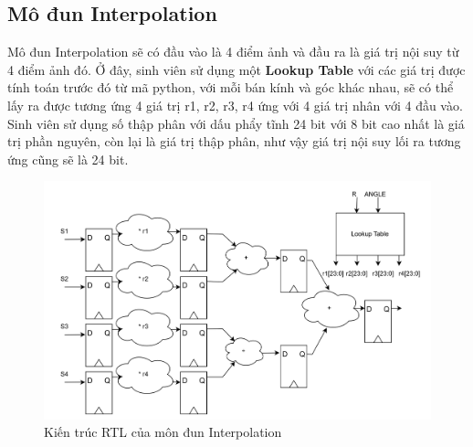 \subsection{Mô đun Interpolation}
Mô đun Interpolation sẽ có đầu vào là 4 điểm ảnh và đầu ra là giá trị nội suy từ 4 điểm ảnh đó. Ở đây, sinh viên sử dụng một \textbf{Lookup Table} với các giá trị được tính toán trước đó từ mã python, với mỗi bán kính và góc khác nhau, sẽ có thể lấy ra được tương ứng 4 giá trị r1, r2, r3, r4 ứng với 4 giá trị nhân với 4 đầu vào. Sinh viên sử dụng số thập phân với dấu phẩy tĩnh 24 bit với 8 bit cao nhất là giá trị phần nguyên, còn lại là giá trị thập phân, như vậy giá trị nội suy lối  ra tương ứng cũng sẽ là 24 bit. 
\begin{figure}[!ht]
	\centering
	\includegraphics[width=1\linewidth]{figures/interpolationRTL.png}
	\caption{Kiến trúc RTL của môn đun Interpolation}
	\label{fig:interpolationRTL}
\end{figure}
